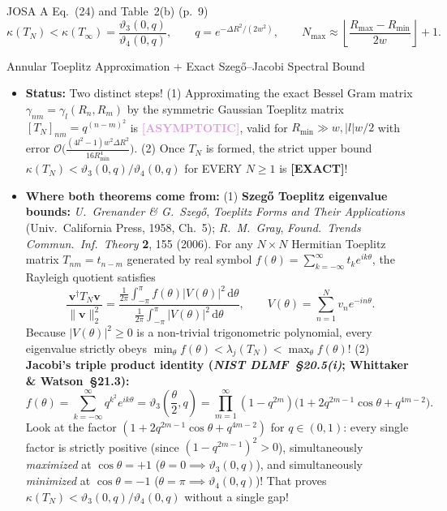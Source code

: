 \documentclass[10pt,letterpaper]{article}
\newcommand{\norm}[1]{\lVert #1 \rVert}
\newcommand{\abs}[1]{\lvert #1 \rvert}
\newcommand{\dd}{\mathrm{d}}
\newcommand{\tagexact}{\textcolor{forest}{\textbf{[EXACT]}}}
\newcommand{\tagasymp}{\textcolor{plum}{\textbf{[ASYMPTOTIC]}}}
\numberwithin{equation}{section}
\begin{document}
\begin{targeteq}{JOSA A Eq.~(24) and Table~2(b) (p.~9)}
\[
  \kappa(T_N) < \kappa(T_\infty) = \frac{\vartheta_3(0,q)}{\vartheta_4(0,q)}, \qquad q = e^{-\Delta R^2/(2w^2)}, \qquad N_{\max} \approx \left\lfloor \frac{R_{\max}-R_{\min}}{2w} \right\rfloor + 1.
\]
\end{targeteq}

\begin{approxbox}{Annular Toeplitz Approximation + Exact Szeg\H{o}--Jacobi Spectral Bound}
\begin{itemize}[leftmargin=1.4em,itemsep=2pt,topsep=1pt]
  \item \textbf{Status:} Two distinct steps! (1) Approximating the exact Bessel Gram matrix $\gamma_{nm} = \gamma_l(R_n,R_m)$ by the symmetric Gaussian Toeplitz matrix $[T_N]_{nm} = q^{(n-m)^2}$ is \tagasymp{}, valid for $R_{\min} \gg w, \abs{l}w/2$ with error $\mathcal{O}\bigl(\frac{(4l^2-1)w^2\Delta R^2}{16 R_{\min}^4}\bigr)$. (2) Once $T_N$ is formed, the strict upper bound $\kappa(T_N) < \vartheta_3(0,q)/\vartheta_4(0,q)$ for EVERY $N \ge 1$ is \tagexact{}!
  \item \textbf{Where both theorems come from:}
    (1) \textbf{Szeg\H{o} Toeplitz eigenvalue bounds:} \emph{U.\ Grenander \& G.\ Szeg\H{o}}, \emph{Toeplitz Forms and Their Applications} (Univ.\ California Press, 1958, Ch.~5); \emph{R.\ M.\ Gray}, \emph{Found.\ Trends Commun.\ Inf.\ Theory} \textbf{2}, 155 (2006). For any $N\times N$ Hermitian Toeplitz matrix $T_{nm} = t_{n-m}$ generated by real symbol $f(\theta) = \sum_{k=-\infty}^\infty t_k e^{ik\theta}$, the Rayleigh quotient satisfies
    \[
      \frac{\mathbf{v}^\dagger T_N\mathbf{v}}{\norm{\mathbf{v}}_2^2} = \frac{\frac{1}{2\pi}\int_{-\pi}^\pi f(\theta)\abs{V(\theta)}^2\,\dd\theta}{\frac{1}{2\pi}\int_{-\pi}^\pi \abs{V(\theta)}^2\,\dd\theta}, \qquad V(\theta) = \sum_{n=1}^N v_n e^{-in\theta}.
    \]
    Because $\abs{V(\theta)}^2 \ge 0$ is a non-trivial trigonometric polynomial, every eigenvalue strictly obeys $\min_\theta f(\theta) < \lambda_j(T_N) < \max_\theta f(\theta)$!
    (2) \textbf{Jacobi's triple product identity (\emph{NIST DLMF~\S20.5(i)}; Whittaker \& Watson~\S21.3):}
    \[
      f(\theta) = \sum_{k=-\infty}^\infty q^{k^2} e^{ik\theta} = \vartheta_3\!\left(\frac{\theta}{2}, q\right) = \prod_{m=1}^\infty (1 - q^{2m})\bigl(1 + 2q^{2m-1}\cos\theta + q^{4m-2}\bigr).
    \]
    Look at the factor $(1 + 2q^{2m-1}\cos\theta + q^{4m-2})$ for $q \in (0,1)$: every single factor is strictly positive (since $(1 - q^{2m-1})^2 > 0$), simultaneously \emph{maximized} at $\cos\theta = +1$ ($\theta = 0 \implies \vartheta_3(0,q)$), and simultaneously \emph{minimized} at $\cos\theta = -1$ ($\theta = \pi \implies \vartheta_4(0,q)$)! That proves $\kappa(T_N) < \vartheta_3(0,q)/\vartheta_4(0,q)$ without a single gap!
\end{itemize}
\end{approxbox}
\end{document}
